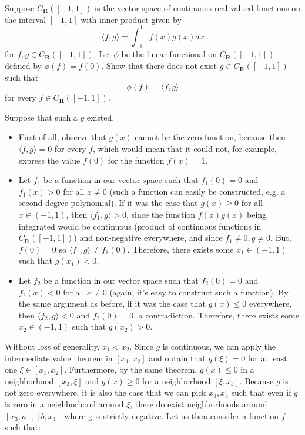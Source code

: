 \begin{exercise}{15}
    Suppose $C_{\mathbf{R}}([-1, 1])$ is the vector space of continuous real-valued functions on the interval $[-1, 1]$ with inner product given by
    $$\langle f, g \rangle = \int_{-1}^{1} f(x)g(x) dx$$
    for $f, g \in C_{\mathbf{R}}([-1, 1])$. Let $\phi$ be the linear functional on $C_{\mathbf{R}}([-1, 1])$ defined by $\phi(f) = f(0)$. Show that there does not exist $g \in C_{\mathbf{R}}([-1, 1])$ such that
    $$\phi(f) = \langle f, g \rangle$$
    for every $f \in C_{\mathbf{R}}([-1, 1])$.
\end{exercise}

\begin{solution}

    Suppose that such a $g$ existed. 
    \begin{itemize}
        \item First of all, observe that $g(x)$ cannot be the zero function, because then $\langle f, g \rangle = 0$ for every $f$, which would mean that it could not, for example, express the value $f(0)$ for the function $f(x) = 1$. 
        \item Let $f_1$ be a function in our vector space such that $f_1(0) = 0$ and $f_1(x) > 0$ for all $x \neq 0$ (such a function can easily be constructed, e.g. a second-degree polynomial). If it was the case that $g(x) \geq 0$ for all $x \in (-1, 1)$, then $\langle f_1, g \rangle > 0$, since the function $f(x)g(x)$ being integrated would be continuous (product of continuous functions in $C_{\mathbf{R}}([-1, 1])$) and non-negative everywhere, and since $f_1 \neq 0, g \neq 0$. But, $f(0) = 0$ so $\langle f_1, g \rangle \neq f_1(0)$. Therefore, there exists some $x_1 \in (-1, 1)$ such that $g(x_1) < 0$.
        \item Let $f_2$ be a function in our vector space such that $f_2(0) = 0$ and $f_2(x) < 0$ for all $x \neq 0$ (again, it's easy to construct such a function). By the same argument as before, if it was the case that $g(x) \leq 0$ everywhere, then $\langle f_2, g \rangle < 0$ and $f_2(0) = 0$, a contradiction. Therefore, there exists some $x_2 \in (-1, 1)$ such that $g(x_2) > 0$.
    \end{itemize}
    Without loss of generality, $x_1 < x_2$. Since $g$ is continuous, we can apply the intermediate value theorem in $[x_1, x_2]$ and obtain that $g(\xi) = 0$ for at least one $\xi \in [x_1, x_2]$. Furthermore, by the same theorem, $g(x) \leq 0$ in a neighborhood $[x_3, \xi]$ and $g(x) \geq 0$ for a neighborhood $[\xi, x_4]$. Because $g$ is not zero everywhere, it is also the case that we can pick $x_3, x_4$ such that even if $g$ is zero in a neighborhood around $\xi$, there do exist neighborhoods around $[x_3, a], [b, x_4]$ where g is strictly negative. Let us then consider a function $f$ such that:

\end{solution}
